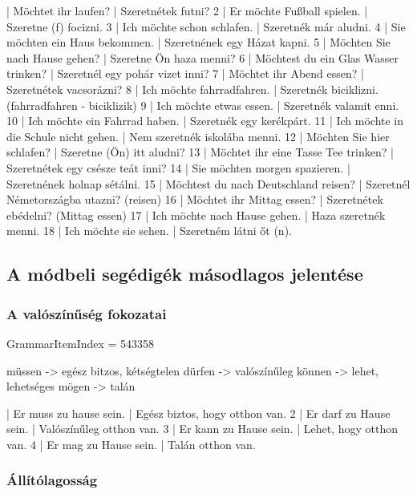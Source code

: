\documentclass{article}
\newenvironment{desc}{\verbatim}{\endverbatim}
\newenvironment{exmp}{\verbatim}{\endverbatim}
\begin{document}
\begin{exmp}
1 | Möchtet ihr laufen? | Szeretnétek futni?
2 | Er möchte Fußball spielen. | Szeretne (f) focizni.
3 | Ich möchte schon schlafen. | Szeretnék már aludni.
4 | Sie möchten ein Haus bekommen. | Szeretnének egy Házat kapni.
5 | Möchten Sie nach Hause gehen? | Szeretne Ön haza menni?
6 | Möchtest du ein Glas Wasser trinken? | Szeretnél egy pohár vizet inni?
7 | Möchtet ihr Abend essen? | Szeretnétek vacsorázni?
8 | Ich möchte fahrradfahren. | Szeretnék biciklizni. (fahrradfahren - biciklizik)
9 | Ich möchte etwas essen. | Szeretnék valamit enni.
10 | Ich möchte ein Fahrrad haben. | Szeretnék egy kerékpárt.
11 | Ich möchte in die Schule nicht gehen. | Nem szeretnék iskolába menni.
12 | Möchten Sie hier schlafen? | Szeretne (Ön) itt aludni?
13 | Möchtet ihr eine Tasse Tee trinken? | Szeretnétek egy csésze teát inni?
14 | Sie möchten morgen spazieren. | Szeretnének holnap sétálni.
15 | Möchtest du nach Deutschland reisen? | Szeretnél Németországba utazni? (reisen)
16 | Möchtet ihr Mittag essen? | Szeretnétek ebédelni? (Mittag essen)
17 | Ich möchte nach Hause gehen. | Haza szeretnék menni.
18 | Ich möchte sie sehen. | Szeretném látni őt (n).
\end{exmp}

\subsection{A módbeli segédigék másodlagos jelentése}

\subsubsection{A valószínűség fokozatai}

GrammarItemIndex = 543358

\begin{desc}
müssen -> egész bitzos, kétségtelen
dürfen -> valószínűleg
können -> lehet, lehetséges
mögen -> talán
\end{desc}

\begin{exmp}
1 | Er muss zu hause sein. | Egész biztos, hogy otthon van.
2 | Er darf zu Hause sein. | Valószínűleg otthon van.
3 | Er kann zu Hause sein. | Lehet, hogy otthon van.
4 | Er mag zu Hause sein. | Talán otthon van.
\end{exmp}

\subsubsection{Állítólagosság}
\end{document}
